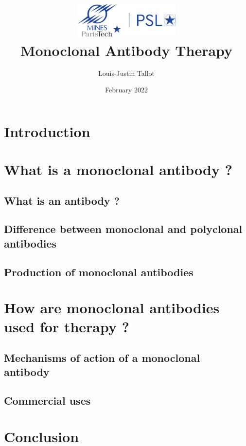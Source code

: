 \documentclass{article}
\title{
  \includegraphics[width=0.4\textwidth]{../Images/Logo_Mines_ParisTech.png}\\
  \vspace{1em}
  \textbf{Monoclonal Antibody Therapy}
}
\author{Louis-Justin Tallot}
\date{February 2022}
\begin{document}
  \maketitle

  \section*{Introduction}
  

  \section{What is a monoclonal antibody ?}

    \subsection{What is an antibody ?}
    

    \subsection{Difference between monoclonal and polyclonal antibodies}
    

    \subsection{Production of monoclonal antibodies}
    \label{sec:monoclonal_antibody_production}
    

  \section{How are monoclonal antibodies used for therapy ?}
  

    \subsection{Mechanisms of action of a monoclonal antibody}
    

    \subsection{Commercial uses}
    

    \section*{Conclusion}
    

  \printbibliography

  \listoffigures
\end{document}

